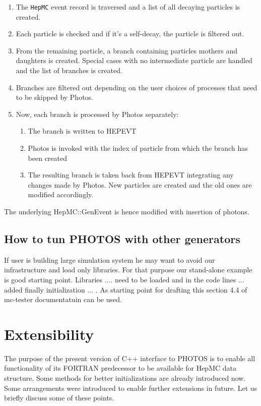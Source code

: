 \documentclass[]{Photos_interface_design}
\begin{document}
\begin{enumerate}
\item The {\tt HepMC} event record is traversed and a list of all decaying
      particles is created.
\item Each particle is checked and if it's a self-decay, the particle is filtered out.
\item From the remaining particle, a branch containing particles mothers and daughters
      is created. Special cases with no intermediate particle are handled and the
	  list of branches is created.
\item Branches are filtered out depending on the user choices of processes
      that need to be skipped by Photos.
\item Now, each branch is processed by Photos separately:

	\begin{enumerate}
  
	\item The branch is written to HEPEVT
	\item Photos is invoked with the index of particle from which the branch
	      has been created
	\item The resulting branch is taken back from HEPEVT integrating any changes
	      made by Photos. New particles are created and the old ones are modified
		  accordingly.

	\end{enumerate}

\end{enumerate}

The underlying HepMC::GenEvent is hence modified with insertion of photons.

\subsection{How to tun PHOTOS with other generators}
If user is building large simulation system he may want to avoid our 
infrastructure and load only libraries. For that purpose our stand-alone 
example is good starting point. Libraries ....  need to be loaded and in 
the code lines ... added finally initialization ... . As starting point for 
drafting  this section 4.4 of mc-tester documentatuin can be used.
\section{Extensibility}
 The purpose of the present version of C++ interface to PHOTOS is to enable 
all functionality of its FORTRAN predecessor to be available for HepMC data
structure. Some methods for better initializations are already introduced
now. Some arrangements were introduced to enable further
extensions in future. Let us briefly discuss some of these points.
 
\end{document}
